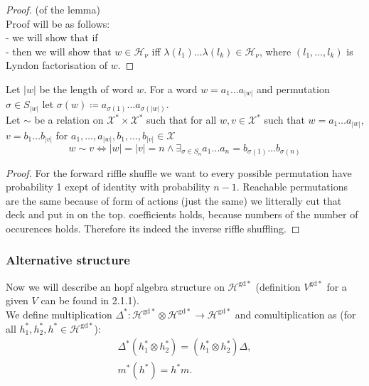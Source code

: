\documentclass[a4paper]{article}
\newcommand{\gdd}[1]{#1^{\mathrm{gd}*}}
\begin{document}
\begin{proof} (of the lemma) \\
Proof will be as follows: \\
- we will show that if \\ 
- then we will show that $w \in \mathcal{H}_\nu$ iff $\lambda(l_1)\dots\lambda(l_k) \in \mathcal{H}_\nu$, 
where $(l_1,\dots,l_k)$ is Lyndon factorisation of $w$. 
\end{proof}

Let $|w|$ be the length of word $w$. For a word $w = a_1\dots a_{|w|}$ and permutation 
$\sigma \in S_{|w|}$ let $\sigma(w) \coloneqq a_{\sigma(1)}\dots a_{\sigma(|w|)}$. \\ Let $\sim$ be 
a relation on $\mathcal{X}^* \times \mathcal{X}^*$ such that for all $w, v \in \mathcal{X}^*$ such that $w = a_1\dots a_{|w|}$, $v = b_1\dots b_{|v|}$ for 
$a_1,\dots, a_{|w|}, b_1, \dots, b_{|v|} \in \mathcal{X}$  
\begin{equation*}
w \sim v \iff |w| = |v| = n \land \exists_{\sigma \in S_n} a_1\dots a_n = b_{\sigma(1)}\dots b_{\sigma(n)}
\end{equation*}

\begin{proof}
For the forward riffle shuffle we want to every possible permutation have probability 1 exept of identity 
with probability $n-1$. Reachable permutations are the same because of form of actions (just the same)
we litterally cut that deck and put in on the top. coefficients holds, because numbers of the number of 
occurences holds. Therefore its indeed the inverse riffle shuffling.
\end{proof}

\subsubsection{Alternative structure} 
\indent Now we will describe an hopf algebra structure on $\mathcal{H}^{\mathrm{gd}*}$ 
{(definition $\gdd{V}$ for a given $V$ can be found in 2.1.1)}. \\
We define multiplication 
$\Delta^* : \mathcal{H}^{\mathrm{gd}*} \otimes \gdd{\mathcal{H}} \to \gdd{\mathcal{H}}$ and 
comultiplication 
\text{$m^* : \gdd{\mathcal{H}} \to \gdd{\mathcal{H}} \otimes \gdd{\mathcal{H}}$} as 
(for all $h_1^*, h_2^*, h^* \in \gdd{\mathcal{H}}$):
\begin{align*}
\Delta^*(h_1^* \otimes h_2^*) = (h_1^* \otimes h_2^*)\Delta, \\
m^*(h^*) = h^*m.
\end{align*}
\end{document}
